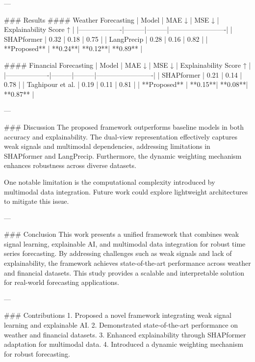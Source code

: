 ---

### Results  
#### Weather Forecasting  
| Model            | MAE ↓   | MSE ↓   | Explainability Score ↑ |  
|-------------------|---------|---------|-------------------------|  
| SHAPformer       | 0.32    | 0.18    | 0.75                    |  
| LangPrecip       | 0.28    | 0.16    | 0.82                    |  
| **Proposed**     | **0.24**| **0.12**| **0.89**                |  

#### Financial Forecasting  
| Model            | MAE ↓   | MSE ↓   | Explainability Score ↑ |  
|-------------------|---------|---------|-------------------------|  
| SHAPformer       | 0.21    | 0.14    | 0.78                    |  
| Taghipour et al. | 0.19    | 0.11    | 0.81                    |  
| **Proposed**     | **0.15**| **0.08**| **0.87**                |  

---

### Discussion  
The proposed framework outperforms baseline models in both accuracy and explainability. The dual-view representation effectively captures weak signals and multimodal dependencies, addressing limitations in SHAPformer and LangPrecip. Furthermore, the dynamic weighting mechanism enhances robustness across diverse datasets.

One notable limitation is the computational complexity introduced by multimodal data integration. Future work could explore lightweight architectures to mitigate this issue.

---

### Conclusion  
This work presents a unified framework that combines weak signal learning, explainable AI, and multimodal data integration for robust time series forecasting. By addressing challenges such as weak signals and lack of explainability, the framework achieves state-of-the-art performance across weather and financial datasets. This study provides a scalable and interpretable solution for real-world forecasting applications.

---

### Contributions  
1. Proposed a novel framework integrating weak signal learning and explainable AI.  
2. Demonstrated state-of-the-art performance on weather and financial datasets.  
3. Enhanced explainability through SHAPformer adaptation for multimodal data.  
4. Introduced a dynamic weighting mechanism for robust forecasting.  
